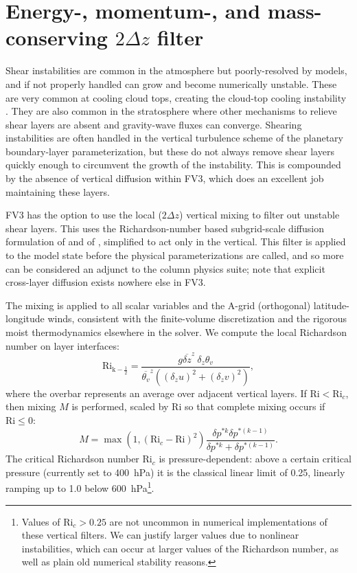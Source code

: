 \documentclass[10pt,letterpaper,margin=1in]{memoir}
\begin{document}

\section{Energy-, momentum-, and mass-conserving $2\Delta z$ filter} \label{sec:2dzfilter}

Shear instabilities are common in the atmosphere but poorly-resolved by models, and if not properly handled can grow and become numerically unstable. These are very common at cooling cloud tops, creating the cloud-top cooling instability \citep{Lilly1968}. They are  also common in the stratosphere where other mechanisms to relieve shear layers are absent and gravity-wave fluxes can converge. Shearing instabilities are often handled in the vertical turbulence scheme of the planetary boundary-layer parameterization, but these do not always remove shear layers quickly enough to circumvent the growth of the instability. This is compounded by the absence of vertical diffusion within FV3, which does an excellent job maintaining these layers. 

FV3 has the option to use the local ($2\Delta z$) vertical mixing to filter out unstable shear layers. This uses the Richardson-number based subgrid-scale diffusion formulation of \citet{Lilly1962} %
and of \citet{Smagorinsky1963}, simplified to act only in the vertical. This filter is applied to the model state before the physical parameterizations are called, and so more can be considered an adjunct to the column physics suite; note that explicit cross-layer diffusion exists nowhere else in FV3.

The mixing is applied to all scalar variables and the A-grid (orthogonal) latitude-longitude winds, consistent with the finite-volume discretization and the rigorous moist thermodynamics elsewhere in the solver. We compute the local Richardson number on layer interfaces:
\begin{equation}
\mathrm{Ri_{k-\frac{1}{2}} } = \frac{g\overline{\delta z}^z \:\delta_{z}\theta_v }{\overline{\theta_v}^z ( (\delta_z u)^2 + (\delta_z v)^2) },
\end{equation}
where the overbar represents an average over adjacent vertical layers.
If $\mathrm{Ri} < \text{Ri}_c$, then mixing $M$ is performed, scaled by Ri so that complete mixing occurs if $\mathrm{Ri} \le 0:$
\begin{equation}
M = \max\left ( 1, \left(\text{Ri}_c - \mathrm{Ri} \right )^2 \right )\frac{\delta p^{*k} \delta p^{*(k-1)}}{\delta p^{*k} + \delta p^{*(k-1)}}.
\end{equation}
The critical Richardson number $\text{Ri}_c$ is pressure-dependent: above a certain critical pressure (currently set to 400~hPa) it is the classical linear limit of 0.25, linearly ramping up to 1.0 below 600~hPa\footnote{Values of $\text{Ri}_c > 0.25$ are not uncommon in numerical implementations of these vertical filters. We can justify larger values due to nonlinear instabilities, which can occur at larger values of the Richardson number, as well as plain old numerical stability reasons.}.
\end{document}
